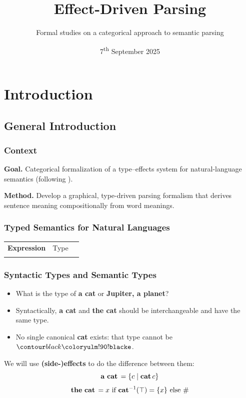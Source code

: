 \documentclass[math, english, info]{beamercours}
\title{Effect-Driven Parsing}
\subtitle{Formal studies on a categorical approach to semantic parsing}
\institute{École Normale Supérieure | Yale University}
\date{7\textsuperscript{th} September 2025}
\begin{document}
\fancytitleframe

\section{Introduction}
\subsection{General Introduction}
\begin{frame}
	\frametitle{Context}
	\textbf{Goal.} Categorical formalization of a type--effects system for
	natural-language semantics
	(following \cite{bumfordEffectdrivenInterpretationFunctors2025}).

	\medskip

	\textbf{Method.} Develop a graphical, type-driven parsing formalism that
	derives sentence meaning compositionally from word meanings.
\end{frame}

\begin{frame}[fragile]
	\frametitle{Typed Semantics for Natural Languages}
	\setcellgapes{3pt}
	\makegapedcells
	\begin{NiceTabular}{>{\bf}LLL}
		Expression & \rm Type & \lambda{} \\
		\CodeAfter
	\end{NiceTabular}
\end{frame}

\begin{frame}[fragile]
	\frametitle{Syntactic Types and Semantic Types}
	\begin{itemize}
		\item What is the type of \textbf{a cat} or \textbf{Jupiter, a planet}?
		      \pause
		\item Syntactically, \textbf{a cat} and \textbf{the cat} should be interchangeable and have the same type.
		\item No single canonical \textbf{cat} exists: that type cannot be $\e$.
	\end{itemize}
	\pause

	We will use \textbf{(side-)effects} to do the difference between them:
	\begin{equation*}
		\mathbf{a\ cat}\, = \{c \mid \mathbf{cat}\, c\}
	\end{equation*}
	\begin{equation*}
		\mathbf{the\ cat}\, = x \text{ if } \mathbf{cat}^{-1}(\top) = \{x\} \text{ else } \#
	\end{equation*}
\end{frame}
\end{document}

